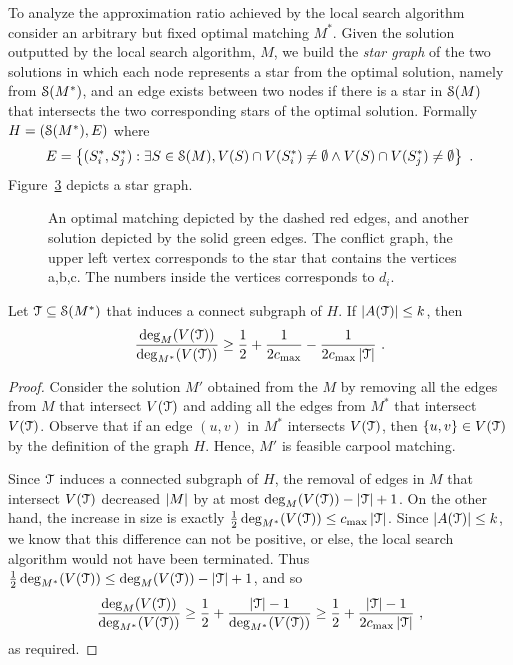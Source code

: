 To analyze the approximation ratio achieved by the local search
algorithm consider an arbitrary but fixed optimal matching $M^*$.
Given the solution outputted by the local search algorithm, $M$, we
build the \emph{star graph} of the two solutions in which each node
represents a star from the optimal solution, namely from $\mathcal{S}(M^*)$,
and an edge exists between two nodes if there is a star in $\mathcal{S}(M)$
that intersects the two corresponding stars of the optimal solution.
%
Formally $H = (\mathcal{S}(M^*), E)$ where
\[
E = \left\{ (S^*_i, S^*_j) : \exists S \in \mathcal{S}(M), 
         V(S) \cap V(S^*_i) \neq \emptyset \land
         V(S) \cap V(S^*_j) \neq \emptyset \right\}
~.
\]
Figure~\ref{fig:conflict} depicts a star graph.

\begin{figure}[t]
%
\begin{subfigure}{.4\linewidth}
\caption{\label{subfloat:graph}}

\end{subfigure}
%
\hfill
%
\begin{subfigure}{.4\linewidth}
\caption{\label{subfloat:conflict}}

\end{subfigure}
%
\caption[]{
An optimal matching depicted by the dashed red edges,
and another solution depicted by the solid green edges.  
The conflict graph, the upper left vertex corresponds 
to the star that contains the vertices a,b,c.
The numbers inside the vertices corresponds to $d_i$.   
}
\label{fig:conflict}
\end{figure}  


\begin{lemma}
\label{lemma:r}
Let $\mathcal{T} \subseteq \mathcal{S}(M^*)$ that induces a connect subgraph of
$H$.  If $\left| A(\mathcal{T}) \right| \leq k$, then
\[
\frac{\deg_M(V(\mathcal{T}))}{\deg_{M^*}(V(\mathcal{T}))} 
\geq \frac{1}{2} + \frac{1}{2c_{\max}} - \frac{1}{2c_{\max}\left| \mathcal{T} \right|}
~.
\]
\end{lemma}
\begin{proof}
Consider the solution $M'$ obtained from the $M$ by removing all the
edges from $M$ that intersect $V(\mathcal{T})$ and adding all the edges from
$M^*$ that intersect $V(\mathcal{T})$.  Observe that if an edge $(u,v)$ in
$M^*$ intersects $V(\mathcal{T})$, then $\left\{ u,v \right\} \in V(\mathcal{T})$ by the
definition of the graph $H$.  Hence, $M'$ is feasible carpool
matching.

Since $\mathcal{T}$ induces a connected subgraph of $H$, the removal of
edges in $M$ that intersect $V(\mathcal{T})$ decreased $\left| M \right|$ by at most
$\deg_M(V(\mathcal{T})) - \left| \mathcal{T} \right| + 1$.
%
On the other hand, the increase in size is exactly
 $\frac{1}{2} \deg_{M^*}(V(\mathcal{T})) \leq c_{\max} \left| \mathcal{T} \right|$.
%
Since $\left| A(\mathcal{T}) \right| \leq k$, we know that this difference can not be
positive, or else, the local search algorithm would not have been
terminated.  Thus 
\(
\frac{1}{2} \deg_{M^*}(V(\mathcal{T})) \leq \deg_M(V(\mathcal{T})) - \left| \mathcal{T} \right| + 1
\),
and so
\[
\frac{\deg_M(V(\mathcal{T}))}{\deg_{M^*}(V(\mathcal{T}))}
\geq \frac{1}{2} + \frac{\left| \mathcal{T} \right| - 1}{\deg_{M^*}(V(\mathcal{T}))}
\geq \frac{1}{2} + \frac{\left| \mathcal{T} \right| - 1}{2c_{\max} \left| \mathcal{T} \right|}
~,
\]
as required.
\end{proof}



